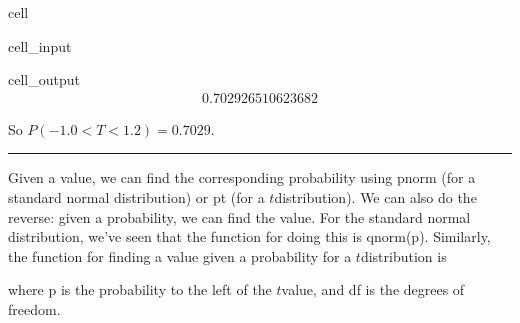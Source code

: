 \documentclass[letterpaper,10pt,english]{jupyterBook}
\begin{document}
\begin{sphinxuseclass}{cell}\begin{sphinxVerbatimInput}

\begin{sphinxuseclass}{cell_input}
\begin{sphinxVerbatim}[commandchars=\\\{\}]
\end{sphinxVerbatim}

\end{sphinxuseclass}\end{sphinxVerbatimInput}
\begin{sphinxVerbatimOutput}

\begin{sphinxuseclass}{cell_output}\begin{equation*}
\begin{split}0.702926510623682\end{split}
\end{equation*}
\end{sphinxuseclass}\end{sphinxVerbatimOutput}

\end{sphinxuseclass}
\sphinxAtStartPar
So \(P(-1.0 < T < 1.2) = 0.7029\).


\bigskip\hrule\bigskip


\sphinxAtStartPar
Given a value, we can find the corresponding probability using pnorm (for a standard normal distribution) or pt (for a \(t\)\sphinxhyphen{}distribution). We can also do the reverse: given a probability, we can find the value. For the standard normal distribution, we’ve seen that the function for doing this is qnorm(p). Similarly, the function for finding a value given a probability for a \(t\)\sphinxhyphen{}distribution is

\begin{sphinxVerbatim}[commandchars=\\\{\}]
\end{sphinxVerbatim}

\sphinxAtStartPar
where p is the probability to the left of the \(t\)\sphinxhyphen{}value, and df is the degrees of freedom.
\end{document}
